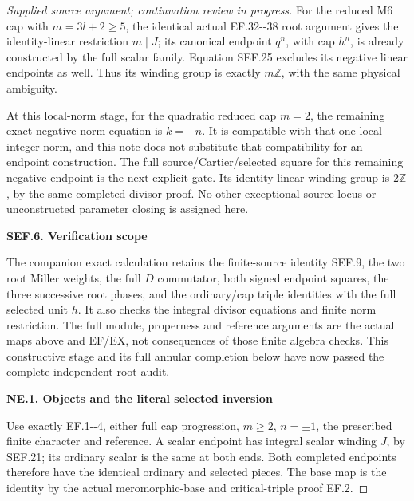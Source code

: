\begin{proof}[Supplied source argument; continuation review in progress]
For the reduced M6 cap with \(m=3l+2\ge5\), the identical actual
EF.32-\/-38 root argument gives the identity-linear restriction
\(m\mid J\); its canonical endpoint \(q^n\), with cap \(h^n\), is
already constructed by the full scalar family. Equation SEF.25
excludes its negative linear endpoints as well. Thus its winding
group is exactly \(m\mathbb Z\), with the same physical ambiguity.

At this local-norm stage, for the quadratic reduced cap \(m=2\), the remaining exact negative
norm equation is \(k=-n\). It is compatible with that one local
integer norm, and this note does not substitute that compatibility
for an endpoint construction. The full source/Cartier/selected
square for this remaining negative endpoint is the next explicit
gate. Its identity-linear winding group is \(2\mathbb Z\), by the
same completed divisor proof. No other exceptional-source locus
or unconstructed parameter closing is assigned here.

\par

\medskip\noindent\textbf{SEF.6. Verification scope}

\par\nobreak

The companion exact calculation retains the finite-source identity
SEF.9, the two root Miller weights, the full \(D\) commutator, both
signed endpoint squares, the three successive root phases, and the
ordinary/cap triple identities with the full selected unit \(h\).
It also checks the integral divisor equations and finite norm
restriction. The full module, properness and reference arguments
are the actual maps above and EF/EX, not consequences of those
finite algebra checks. This constructive stage and its full annular completion below have now passed the complete independent root audit.

\par

\medskip\noindent\textbf{NE.1. Objects and the literal selected inversion}

\par\nobreak

Use exactly EF.1-\/-4, either full cap progression, \(m\ge2\),
\(n=\pm1\), the prescribed finite character and reference. A scalar
endpoint has integral scalar winding \(J\), by SEF.21; its ordinary
scalar is the same at both ends. Both completed endpoints therefore
have the identical ordinary and selected pieces. The base map is the
identity by the actual meromorphic-base and critical-triple proof EF.2.


\end{proof}
